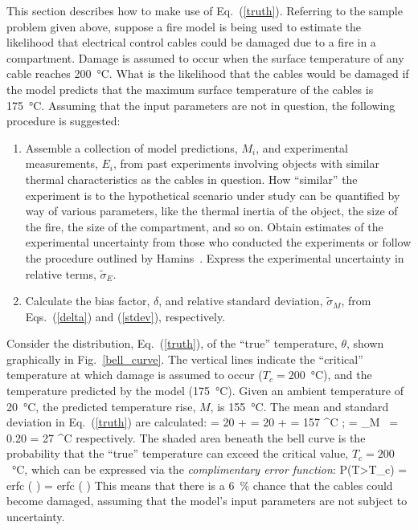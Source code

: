 This section describes how to make use of Eq.~(\ref{truth}). Referring to the sample problem given above, suppose a fire model is being used to estimate the likelihood that
electrical control cables could be damaged due to a fire in a compartment.
Damage is assumed to occur when the surface temperature of any cable reaches 200~\unit{\degreeCelsius}.
What is the likelihood that the cables would be damaged if the
model predicts that the maximum surface temperature of the cables is 175~\unit{\degreeCelsius}. Assuming that the input parameters are not in question, the following
procedure is suggested:
\begin{enumerate}
\item Assemble a collection of model predictions, $M_i$, and experimental measurements, $E_i$, from
past experiments involving objects with similar thermal characteristics as the cables in question.
How ``similar'' the experiment is to the hypothetical scenario under study can be quantified by way of
various parameters, like the thermal inertia of the object, the size of the fire, the size of the compartment, and so on. Obtain estimates of the
experimental uncertainty from those who conducted the experiments or follow the procedure outlined by Hamins~\cite{NUREG_1824_Sup_1}. Express the
experimental uncertainty in relative terms, $\widetilde{\sigma}_E$.
\item Calculate the bias factor, $\delta$, and relative standard deviation, $\tilde{\sigma}_M$, from Eqs.~(\ref{delta}) and (\ref{stdev}), respectively.
\end{enumerate}
Consider the distribution, Eq.~(\ref{truth}), of the ``true'' temperature, $\theta$, shown graphically in Fig.~\ref{bell_curve}.
The vertical lines indicate the ``critical'' temperature at which damage is assumed to occur ($T_c=200$~\unit{\degreeCelsius}), and the temperature predicted by the
model (175~\unit{\degreeCelsius}). Given an ambient temperature of 20~\unit{\degreeCelsius}, the predicted temperature rise, $M$, is 155~\unit{\degreeCelsius}.
The mean and standard deviation in Eq.~(\ref{truth}) are calculated:
\be \mu = 20 +  = 20 +  = 157 \; ^\circ \hbox{C}  \quad ; \quad
   \sigma = \widetilde{\sigma}_M \,  = 0.20 \times {} = 27 \; ^\circ \hbox{C}  \ee
respectively. The shaded area beneath the bell curve is the probability that the ``true'' temperature can exceed the
critical value, $T_c=200$~\unit{\degreeCelsius}, which can be expressed via the {\em complimentary error function}:
\be P(T>T_c) =  \hbox{erfc} \left(  \right) =  \hbox{erfc} \left(  \right)   \ee
This means that there is a 6~\% chance that the cables could become damaged, assuming that the model's input parameters are not
subject to uncertainty.


